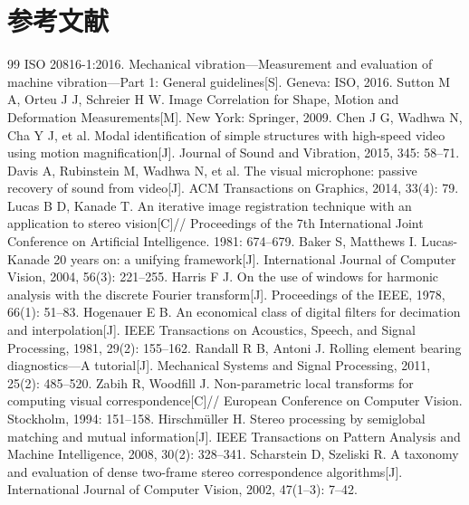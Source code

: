 \section{参考文献}
\begingroup
\renewcommand{\section}[2]{}
\small
\begin{thebibliography}{99}
\setlength{\itemsep}{2pt}
 ISO 20816-1:2016. Mechanical vibration---Measurement and evaluation of machine vibration---Part 1: General guidelines[S]. Geneva: ISO, 2016.
 Sutton M A, Orteu J J, Schreier H W. Image Correlation for Shape, Motion and Deformation Measurements[M]. New York: Springer, 2009.
 Chen J G, Wadhwa N, Cha Y J, et al. Modal identification of simple structures with high-speed video using motion magnification[J]. Journal of Sound and Vibration, 2015, 345: 58--71.
 Davis A, Rubinstein M, Wadhwa N, et al. The visual microphone: passive recovery of sound from video[J]. ACM Transactions on Graphics, 2014, 33(4): 79.
 Lucas B D, Kanade T. An iterative image registration technique with an application to stereo vision[C]// Proceedings of the 7th International Joint Conference on Artificial Intelligence. 1981: 674--679.
 Baker S, Matthews I. Lucas-Kanade 20 years on: a unifying framework[J]. International Journal of Computer Vision, 2004, 56(3): 221--255.
 Harris F J. On the use of windows for harmonic analysis with the discrete Fourier transform[J]. Proceedings of the IEEE, 1978, 66(1): 51--83.
 Hogenauer E B. An economical class of digital filters for decimation and interpolation[J]. IEEE Transactions on Acoustics, Speech, and Signal Processing, 1981, 29(2): 155--162.
 Randall R B, Antoni J. Rolling element bearing diagnostics---A tutorial[J]. Mechanical Systems and Signal Processing, 2011, 25(2): 485--520.
 Zabih R, Woodfill J. Non-parametric local transforms for computing visual correspondence[C]// European Conference on Computer Vision. Stockholm, 1994: 151--158.
 Hirschmüller H. Stereo processing by semiglobal matching and mutual information[J]. IEEE Transactions on Pattern Analysis and Machine Intelligence, 2008, 30(2): 328--341.
 Scharstein D, Szeliski R. A taxonomy and evaluation of dense two-frame stereo correspondence algorithms[J]. International Journal of Computer Vision, 2002, 47(1--3): 7--42.

\end{thebibliography}
